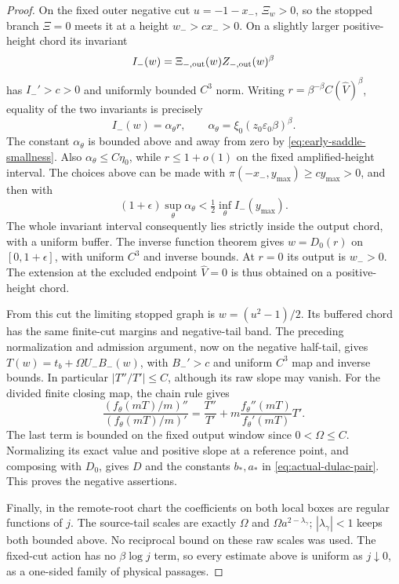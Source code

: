 \begin{proof}
On the fixed outer negative cut \(u=-1-x_-\),
\(\Xi_w>0\), so the stopped branch \(\Xi=0\)
meets it at a height \(w_->c x_->0\). On a slightly larger
positive-height chord its invariant
\[
 I_-(w)=\Xi_{-,\rm out}(w)Z_{-,\rm out}(w)^\beta
\]
has \(I_-'>c>0\) and uniformly bounded \(C^3\) norm.
Writing \(r=\beta^{-\beta}C(\widehat V)^\beta\), equality
of the two invariants is precisely
\[
 I_-(w)=\alpha_\theta r,\qquad
 \alpha_\theta=\xi_0(z_0\varepsilon_0\beta)^\beta .
\]
The constant \(\alpha_\theta\) is bounded above and away from
zero by \eqref{eq:early-saddle-smallness}. Also
\(\alpha_\theta\le C\eta_0\), while \(r\le1+o(1)\)
on the fixed amplified-height interval. The choices above can be
made with \(\pi(-x_-,y_{\max})\ge c y_{\max}>0\), and
then with
\[
 (1+\epsilon)\sup_\theta\alpha_\theta
       <\tfrac12\inf_\theta I_-(y_{\max}).
\]
The whole invariant interval consequently lies strictly inside the
output chord, with a uniform buffer. The inverse function theorem gives
\(w=D_0(r)\) on \([0,1+\epsilon]\), with uniform \(C^3\)
and inverse bounds. At \(r=0\) its output is \(w_->0\).
The extension at the excluded endpoint \(\widehat V=0\) is thus
obtained on a positive-height chord.

From this cut the limiting stopped graph is \(w=(u^2-1)/2\).
Its buffered chord has the same finite-cut margins and negative-tail
band. The preceding normalization and admission argument, now on the
negative half-tail, gives
\(T(w)=t_b+\Omega U_-B_-(w)\), with \(B_-'>c\) and uniform
\(C^3\) map and inverse bounds. In particular \(|T''/T'|\le C\),
although its raw slope may vanish.
For the divided finite closing map, the chain rule gives
\[
 \frac{(f_\theta(mT)/m)''}{(f_\theta(mT)/m)'}
   =\frac{T''}{T'}+
      m\frac{f_\theta''(mT)}{f_\theta'(mT)}T' .
\]
The last term is bounded on the fixed output window since
\(0<\Omega\le C\). Normalizing its exact value and positive
slope at a reference point, and composing with \(D_0\), gives
\(D\) and the constants \(b_*,a_*\) in
\eqref{eq:actual-dulac-pair}. This proves the negative assertions.

Finally, in the remote-root chart the coefficients on both local
boxes are regular functions of \(j\). The source-tail scales are
exactly \(\Omega\) and \(\Omega a^{2-\lambda_\gamma}\);
\(|\lambda_\gamma|<1\) keeps both bounded above. No reciprocal
bound on these raw scales was used. The fixed-cut action has no
\(\beta\log j\) term, so every estimate above is uniform as
\(j\downarrow0\), as a one-sided family of physical passages.
\end{proof}
